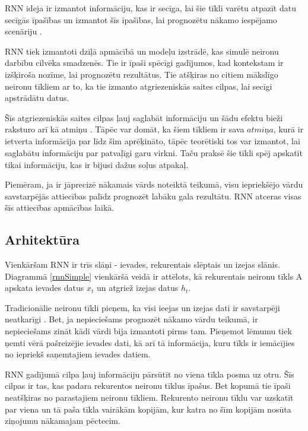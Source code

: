 \documentclass[12pt,paper=A4]{report}
\begin{document}
    RNN ideja ir izmantot informāciju, kas ir secīga, lai šie tīkli varētu atpazīt datu secīgās īpašības un izmantot šīs īpašības, lai prognozētu nākamo iespējamo scenāriju \cite{http://www.wildml.com/2015/09/recurrent-neural-networks-tutorial-part-1-introduction-to-rnns/}. 
 
    RNN tiek izmantoti dziļā apmācībā un modeļu izstrādē, kas simulē neironu darbību cilvēka smadzenēs. Tie ir īpaši spēcīgi gadījumos, kad kontekstam ir izšķiroša nozīme, lai prognozētu rezultātus. Tie atšķiras no citiem mākslīgo neironu tīkliem ar to, ka tie izmanto atgriezeniskās saites cilpas, lai secīgi apstrādātu datus. 
    
    Šīs atgriezeniskās saites cilpas ļauj saglabāt informāciju un šādu efektu bieži raksturo arī kā atmiņu \cite{rnnLstm}. Tāpēc var domāt, ka šiem tīkliem ir sava $atmiņa$, kurā ir ietverta informācija par līdz šim aprēķināto, tāpēc teorētiski tos var izmantot, lai saglabātu informāciju par patvaļīgi garu virkni. Taču praksē šie tīkli spēj apskatīt tikai informāciju, kas ir bijusi dažus soļus atpakaļ. 

Piemēram, ja ir jāprecizē nākamais vārds noteiktā teikumā, visu iepriekšējo vārdu savstarpējās attiecības palīdz prognozēt labāku gala rezultātu. RNN atceras visas šīs attiecības apmācības laikā.
    
   
\subsection{Arhitektūra}    
    
Vienkāršam RNN ir trīs slāņi - ievades, rekurentais slēptais un izejas slānis. Diagrammā \ref{rnnSimple} vienkāršā veidā ir attēlots, kā rekurentais neironu tīkls A apskata ievades datus $x_t$ un atgriež izejas datus $h_t$. 

 Tradicionālie neironu tīkli pieņem, ka visi ieejas un izejas dati ir savstarpēji neatkarīgi \cite{http://www.wildml.com/2015/09/recurrent-neural-networks-tutorial-part-1-introduction-to-rnns/}. Bet, ja nepieciešams prognozēt nākamo vārdu teikumā, ir nepieciešams zināt kādi vārdi bija izmantoti pirms tam. Pieņemot lēmumu tiek ņemti vērā pašreizējie ievades dati, kā arī tā informācija, kuru tīkls ir iemācījies no iepriekš saņemtajiem ievades datiem. 
    
    RNN gadījumā cilpa ļauj informāciju pārsūtīt no viena tīkla posma uz otru. Šīs cilpas ir tas, kas padara rekurentos neironu tīklus īpašus. Bet kopumā tie īpaši neatšķiras no parastajiem neironu tīkliem. Rekurento neironu tīklu var uzskatīt par viena un tā paša tīkla vairākām kopijām, kur katra no šīm kopijām nosūta ziņojumu nākamajam pēctecim. 
\end{document}
